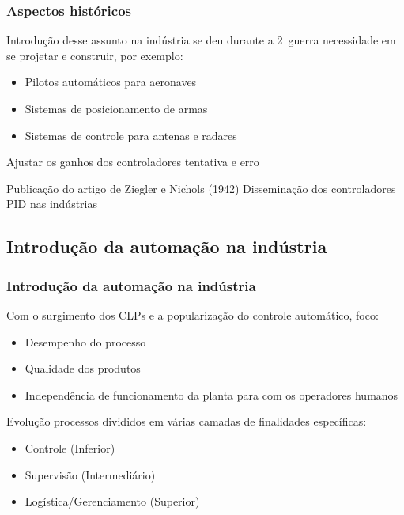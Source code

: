 \documentclass{beamer}
\begin{document}
\begin{frame}
    \frametitle{Aspectos históricos}

    Introdução desse assunto na indústria se deu durante a 2\textordfeminine\
    guerra \implica necessidade em se projetar e construir, por exemplo:

\begin{itemize}
    \item Pilotos automáticos para aeronaves
    \item Sistemas de posicionamento de armas
    \item Sistemas de controle para antenas e radares
\end{itemize}

    Ajustar os ganhos dos controladores \implica tentativa e erro

    \vspace{0.25cm}

    Publicação do artigo de Ziegler e Nichols (1942) \implica Disseminação dos
    controladores PID nas indústrias
\end{frame}

\subsection{Introdução da automação na indústria}
\begin{frame}
    \frametitle{Introdução da automação na indústria}

    Com o surgimento dos CLPs e a popularização do controle automático, foco:

\begin{itemize}
    \item Desempenho do processo
    \item Qualidade dos produtos 
    \item Independência de funcionamento da planta para com os operadores
          humanos
\end{itemize}

    Evolução \implica processos divididos em várias camadas de finalidades
    específicas:

\begin{itemize}
    \item Controle (Inferior)
    \item Supervisão (Intermediário)
    \item Logística/Gerenciamento (Superior)
\end{itemize}
    
\end{frame}
\end{document}
